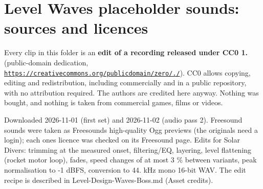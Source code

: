 \chapter{Level Waves placeholder sounds: sources and licences }
\hypertarget{md__assets_2_audio_2_level_waves_2_c_r_e_d_i_t_s}{}\label{md__assets_2_audio_2_level_waves_2_c_r_e_d_i_t_s}
\label{md__assets_2_audio_2_level_waves_2_c_r_e_d_i_t_s_autotoc_md0}%
%


Every clip in this folder is an {\bfseries{edit of a recording released under CC0 1.}} (public-\/domain dedication, \href{https://creativecommons.org/publicdomain/zero/1.0/}{\texttt{https:\+/\+/\+creativecommons.\+org/\+publicdomain/\+zero/./}}). CC0 allows copying, editing and redistribution, including commercially and in a public repository, with no attribution required. The authors are credited here anyway. Nothing was bought, and nothing is taken from commercial games, films or videos.

Downloaded 2026-\/11-\/01 (first set) and 2026-\/11-\/02 (audio pass 2). Freesound sounds were taken as Freesound\textquotesingle{}s high-\/quality Ogg previews (the originals need a login); each one\textquotesingle{}s licence was checked on its Freesound page. Edits for Solar Divers: trimming at the measured onset, filtering/\+\+EQ, layering, level flattening (rocket motor loop), fades, speed changes of at most 3 \% between variants, peak normalisation to -\/1 d\+BFS, conversion to 44. k\+Hz mono 16-\/bit WAV. The edit recipe is described in {\ttfamily Level-\/\+Design-\/\+Waves-\/\+Boss.\+md} (Asset credits).


